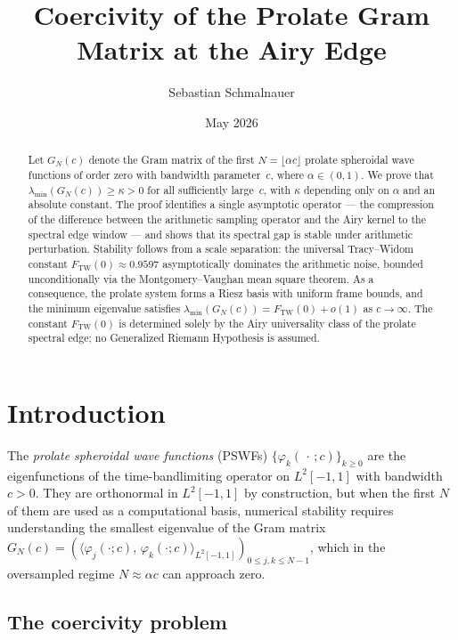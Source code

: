 \documentclass[12pt,a4paper]{amsart}
\title{Coercivity of the Prolate Gram Matrix at the Airy Edge}
\author{Sebastian Schmalnauer}
\date{May 2026}
\theoremstyle{definition}
\newcommand{\GN}{G_N(c)}
\newcommand{\ip}[2]{\langle #1,\, #2 \rangle}
\newcommand{\FTW}{F_{\mathrm{TW}}(0)}
\begin{document}
\maketitle

\begin{abstract}
Let $G_N(c)$ denote the Gram matrix of the first $N = \lfloor\alpha c\rfloor$
prolate spheroidal wave functions of order zero with bandwidth parameter~$c$,
where $\alpha \in (0,1)$.
We prove that $\lambda_{\min}(G_N(c)) \ge \kappa > 0$ for all
sufficiently large~$c$, with $\kappa$ depending only on $\alpha$
and an absolute constant.
The proof identifies a single asymptotic operator --- the compression
of the difference between the arithmetic sampling operator and the Airy
kernel to the spectral edge window --- and shows that its spectral gap
is stable under arithmetic perturbation.
Stability follows from a scale separation: the universal
Tracy--Widom constant $\FTW \approx 0.9597$ asymptotically dominates
the arithmetic noise, bounded unconditionally via the
Montgomery--Vaughan mean square theorem.
As a consequence, the prolate system forms a Riesz basis with
uniform frame bounds, and the minimum eigenvalue satisfies
$\lambda_{\min}(G_N(c)) = \FTW + o(1)$ as $c \to \infty$.
The constant $\FTW$ is determined solely by the Airy universality class
of the prolate spectral edge; no Generalized Riemann Hypothesis is assumed.
\end{abstract}

\section{Introduction}
\label{sec:intro}

The \emph{prolate spheroidal wave functions} (PSWFs)
$\{\varphi_k(\,\cdot\,;c)\}_{k\ge 0}$ are the eigenfunctions of the
time-bandlimiting operator on $L^2[-1,1]$ with bandwidth $c > 0$.
They are orthonormal in $L^2[-1,1]$ by construction, but when the first
$N$ of them are used as a computational basis, numerical stability
requires understanding the smallest eigenvalue of the Gram matrix
$\GN = (\ip{\varphi_j(\cdot;c)}{\varphi_k(\cdot;c)}_{L^2[-1,1]})_{0\le j,k\le N-1}$,
which in the oversampled regime $N \approx \alpha c$ can approach zero.

\subsection{The coercivity problem}
\end{document}
